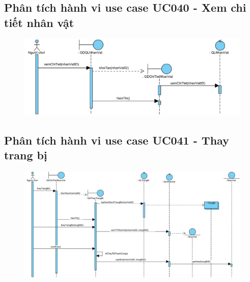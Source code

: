 \documentclass[3p]{elsarticle}
\begin{document}
\subsection{Phân tích hành vi use case UC040 - Xem chi tiết nhân vật}
\begin{figure}[!htbp]
	\hspace*{-.5in}
	\centering
	\includegraphics[scale=.55]{images/sequence-pdfs/gamer/CharacterManagement_ViewDetail.pdf}
\end{figure}
\newpage

\subsection{Phân tích hành vi use case UC041 - Thay trang bị}
\begin{figure}[!htbp]
	\hspace*{-.5in}
	\centering
	\includegraphics[scale=.5]{images/sequence-pdfs/gamer/CharacterManagement_ChangeItems.pdf}
\end{figure}
\newpage
\end{document}
